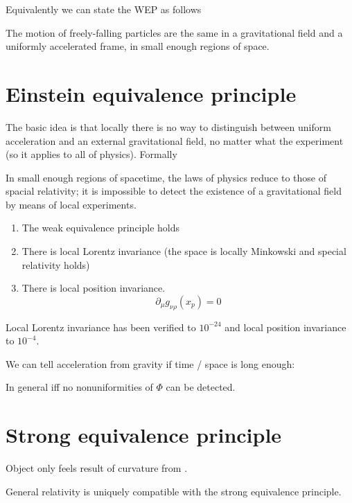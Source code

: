Equivalently we can state the WEP as follows
\begin{eigenschap}
The motion of freely-falling particles are the same in a gravitational field and a uniformly accelerated frame, in small enough regions of space.
\end{eigenschap}

\section{Einstein equivalence principle}
The basic idea is that locally there is no way to distinguish between uniform acceleration and an external gravitational field, no matter what the experiment (so it applies to all of physics). Formally
\begin{eigenschap}
In small enough regions of spacetime, the laws of physics reduce to those of spacial relativity; it is impossible to detect the existence of a gravitational field by means of local experiments.
\end{eigenschap}
\begin{enumerate}
\item The weak equivalence principle holds
\item There is local Lorentz invariance (the space is locally Minkowski and special relativity holds)
\item There is local position invariance.
\[ \partial_\mu g_{\nu\rho}(x_p) = 0 \]
\end{enumerate}
Local Lorentz invariance has been verified to $10^{-24}$ and local position invariance to $10^{-4}$.

We can tell acceleration from gravity if time / space is long enough:


In general iff no nonuniformities of $\Phi$ can be detected.

\section{Strong equivalence principle}
Object only feels result of curvature from .
\begin{eigenschap}
General relativity is uniquely compatible with the strong equivalence principle.
\end{eigenschap}

